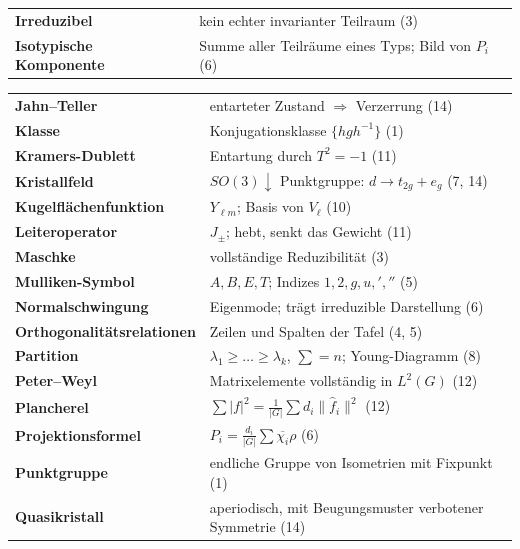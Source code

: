 \begin{merksatz}
\begin{center}
{\begin{tabular}{@{}P{3.4cm}P{5.2cm}@{}}
\textbf{Irreduzibel} & kein echter invarianter Teilraum (3)\\
\textbf{Isotypische Kompo\-nente} & Summe aller Teilräume eines Typs; Bild von $P_i$ (6)\\
\bottomrule
\end{tabular}}
\end{center}
\begin{center}
{\small
\renewcommand{\arraystretch}{1.42}
\begin{tabular}{@{}P{3.4cm}P{5.2cm}@{}}
\toprule
\textbf{Jahn--Teller} & entarteter Zustand $\Rightarrow$ Verzerrung (14)\\
\textbf{Klasse} & Konjugationsklasse $\{hgh^{-1}\}$ (1)\\
\textbf{Kramers-Dublett} & Entartung durch $T^{2} = -1$ (11)\\
\textbf{Kristallfeld} & $SO(3)\downarrow$ Punktgruppe: $d\to t_{2g} + e_g$ (7, 14)\\
\textbf{Kugelflächen\-funktion} & $Y_{\ell m}$; Basis von $V_\ell$ (10)\\
\textbf{Leiteroperator} & $J_\pm$; hebt, senkt das Gewicht (11)\\
\textbf{Maschke} & vollständige Reduzibilität (3)\\
\textbf{Mulliken-Symbol} & $A, B, E, T$; Indizes $1, 2, g, u, ', ''$ (5)\\
\textbf{Normalschwingung} & Eigenmode; trägt irreduzible Darstellung (6)\\
\textbf{Orthogonalitäts\-relationen} & Zeilen und Spalten der Tafel (4, 5)\\
\textbf{Partition} & $\lambda_1\ge\dots\ge\lambda_k$, $\sum = n$; Young-Diagramm (8)\\
\textbf{Peter--Weyl} & Matrixelemente vollständig in $L^{2}(G)$ (12)\\
\textbf{Plancherel} & $\sum|f|^{2} = \frac1{|G|}\sum d_i\|\hat f_i\|^{2}$ (12)\\
\textbf{Projektionsformel} & $P_i = \frac{d_i}{|G|}\sum\overline{\chi_i}\rho$ (6)\\
\textbf{Punktgruppe} & endliche Gruppe von Isometrien mit Fixpunkt (1)\\
\textbf{Quasikristall} & aperiodisch, mit Beugungsmuster verbotener Symmetrie (14)\\
\bottomrule
\end{tabular}}
\end{center}
\begin{center}
{\small
\renewcommand{\arraystretch}{1.42}
\begin{tabular}{@{}P{3.4cm}P{5.2cm}@{}}

\end{tabular}}
\end{center}
\end{merksatz}

